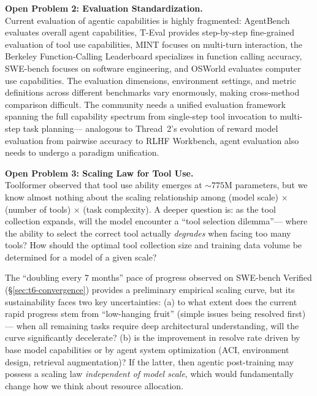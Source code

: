 \begin{openproblembox}
\textbf{Open Problem 2: Evaluation Standardization.}\\
Current evaluation of agentic capabilities is highly fragmented:
AgentBench \citep{liu2023agentbench} evaluates overall agent capabilities,
T-Eval \citep{chen2023teval} provides step-by-step fine-grained evaluation of tool use capabilities,
MINT \citep{wang2023mint} focuses on multi-turn interaction,
the Berkeley Function-Calling Leaderboard \citep{patil2024bfcl} specializes in function calling accuracy,
SWE-bench \citep{jimenez2024swebench} focuses on software engineering,
and OSWorld \citep{xie2024osworld} evaluates computer use capabilities.
The evaluation dimensions, environment settings, and metric definitions across different benchmarks vary enormously,
making cross-method comparison difficult.
The community needs a unified evaluation framework
spanning the full capability spectrum from single-step tool invocation to multi-step task planning---
analogous to Thread~2's evolution of reward model evaluation from pairwise accuracy to RLHF Workbench,
agent evaluation also needs to undergo a paradigm unification.
\end{openproblembox}

\begin{openproblembox}
\textbf{Open Problem 3: Scaling Law for Tool Use.}\\
Toolformer observed that tool use ability emerges at ${\sim}775$M parameters,
but we know almost nothing about the scaling relationship among
(model scale) $\times$ (number of tools) $\times$ (task complexity).
A deeper question is:
as the tool collection expands, will the model encounter a ``tool selection dilemma''---
where the ability to select the correct tool actually \emph{degrades} when facing too many tools?
How should the optimal tool collection size and training data volume be determined for a model of a given scale?

The ``doubling every 7 months'' pace of progress observed on SWE-bench Verified
(\S\ref{sec:t6-convergence})
provides a preliminary empirical scaling curve, but its sustainability faces two key uncertainties:
(a) to what extent does the current rapid progress stem from ``low-hanging fruit''
(simple issues being resolved first)---
when all remaining tasks require deep architectural understanding,
will the curve significantly decelerate?
(b) is the improvement in resolve rate driven by base model capabilities
or by agent system optimization (ACI, environment design, retrieval augmentation)?
If the latter, then agentic post-training may possess
a scaling law \emph{independent of model scale},
which would fundamentally change how we think about resource allocation.
\end{openproblembox}

